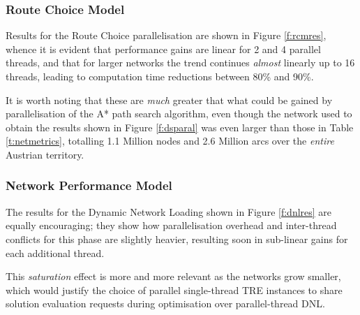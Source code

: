 \subsubsection*{Route Choice Model}
Results for the Route Choice parallelisation are shown in Figure \ref{f:rcmres}, whence it is evident that performance gains are linear for 2 and 4 parallel threads, and that for larger networks the trend continues \emph{almost} linearly up to 16 threads, leading to computation time reductions between 80\% and 90\%.

It is worth noting that these are \emph{much} greater that what could be gained by parallelisation of the A* path search algorithm, even though the network used to obtain the results shown in Figure \ref{f:dsparal} was even larger than those in Table \ref{t:netmetrics}, totalling 1.1 Million nodes and 2.6 Million arcs over the \emph{entire} Austrian territory.


\subsubsection*{Network Performance Model}
The results for the Dynamic Network Loading shown in Figure \ref{f:dnlres} are equally encouraging; they show how parallelisation overhead and inter-thread conflicts for this phase are slightly heavier, resulting soon in sub-linear gains for each additional thread. 

This \emph{saturation} effect is more and more relevant as the networks grow smaller, which would justify the choice of parallel single-thread TRE instances to share solution evaluation requests during optimisation over parallel-thread DNL.

